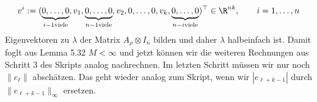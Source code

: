 \begin{solution}
\begin{align*}
  v^i := (\underbrace{0,\dots,0}_{i -1 \text{viele}},v_1,\underbrace{0,\dots,0}_{n - 1 \text{viele}},
  v_2,0,\dots,0,v_k,\underbrace{0,\dots,0}_{n -i \text{viele}})^{\top} \in \R^{nk}, \qquad i = 1,\dots,n
\end{align*}
Eigenvektoren zu $\lambda$ der Matrix $A_{\rho} \otimes I_n$ bilden und daher
$\lambda$ halbeinfach ist. Damit foglt aus Lemma 5.32 $M < \infty$ und jetzt können
wir die weiteren Rechnungen aus Schritt 3 des Skripts analog nachrechnen.
Im letzten Schritt müssen wir nur noch $\|e_{\ell}\|$ abschätzen.
Das geht wieder analog zum Skript, wenn wir $|e_{\ell + k  - 1}|$
durch $\|e_{\ell + k  - 1}\|_{\infty}$ ersetzen.
\end{solution}
